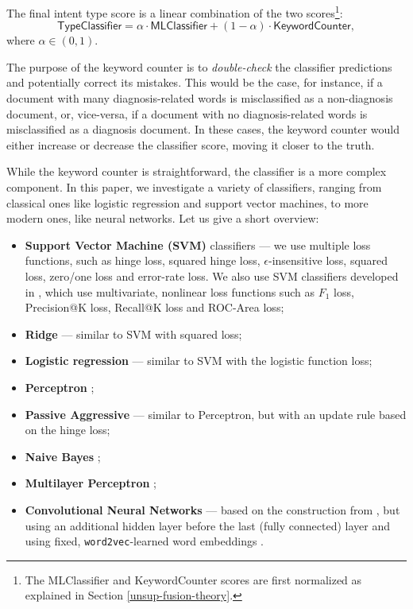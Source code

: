 The final intent type score is a linear combination of the two scores\footnote{The \textsf{MLClassifier} and \textsf{KeywordCounter}
scores are first normalized as explained in Section \ref{unsup-fusion-theory}.}:
\begin{equation}\label{clf-combine-formula}
 \textsf{TypeClassifier} = \alpha\cdot\textsf{MLClassifier} + (1-\alpha)\cdot\textsf{KeywordCounter},
\end{equation}
where $\alpha\in (0,1)$.

The purpose of the keyword counter is to \emph{double-check} the classifier predictions and potentially correct its mistakes.
This would be the case, for instance,
if a document with many diagnosis-related words is misclassified as a non-diagnosis document,
or, vice-versa, if a document with no diagnosis-related words is misclassified as a diagnosis document.
In these cases, the keyword counter would either increase or decrease the classifier score, moving it closer to the truth.


While the keyword counter is straightforward, the classifier is a more complex component. In this paper, we investigate
a variety of classifiers, ranging from classical ones like logistic regression and support vector machines, to more modern
ones, like neural networks. Let us give a short overview:

\begin{itemize}
 \item \textbf{Support Vector Machine (SVM)} classifiers ---
we use multiple loss functions, such as hinge loss,
squared hinge loss, $\epsilon$-insensitive loss, squared loss, zero/one loss and error-rate loss.
We also use SVM classifiers developed in \cite{svmperf3, svmperf1, svmperf2}, which use multivariate,
nonlinear loss functions such as $F_1$ loss, Precision@K loss, Recall@K loss and ROC-Area loss;
\item \textbf{Ridge} \cite{scikit} --- similar to SVM with squared loss;
\item \textbf{Logistic regression} \cite{scikit} --- similar to SVM with the logistic function loss;
\item \textbf{Perceptron} \cite{scikit};
\item \textbf{Passive Aggressive} \cite{passiveAggr} --- similar to Perceptron, but with an update rule
  based on the hinge loss;
\item \textbf{Naive Bayes} \cite{ir-intro};
\item \textbf{Multilayer Perceptron} \cite{scikit};
\item \textbf{Convolutional Neural Networks} --- based on the construction from \cite{cnn}, but using an additional
hidden layer before the last (fully connected) layer and using fixed, \texttt{word2vec}-learned word embeddings \cite{w2v}.
\end{itemize}

